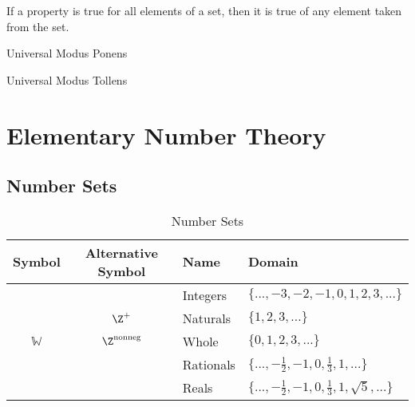 \documentclass[11pt]{article}
\newcommand\W{\ensuremath{\mathbb{W}}}
\begin{document}
\begin{definition}\label{def:universal-instantiation}
    If a property is true for all elements of a set, then it is true of any element taken from the set.
\end{definition}

\begin{bbox}{\centering Universal Modus Ponens}
    \begin{center}
        \begin{argument}
    \end{argument}
    \end{center}
\end{bbox}

\begin{bbox}{\centering Universal Modus Tollens}
    \begin{center}
        \begin{argument}
    \end{argument}
    \end{center}
\end{bbox}

\section{Elementary Number Theory}

\subsection{Number Sets}

\begin{table}[!htbp]
    \centering
    \begin{tabular}{ c c l l }
        \toprule
        Symbol  & Alternative Symbol    & Name      & Domain \\
        \midrule
        \Z      &                       & Integers  & $\{ ..., -3,-2,-1,0,1,2,3, ... \}$ \\
        \N      & $\Z^+$                & Naturals  & $\{ 1,2,3, ... \}$ \\
        \W      & $\Z^{\text{nonneg}}$  & Whole     & $\{ 0,1,2,3, ... \}$ \\
        \Q      &                       & Rationals & $\{ ..., -\frac{1}{2}, -1, 0, \frac{1}{3}, 1, ... \}$ \\
        \R      &                       & Reals     & $\{ ..., -\frac{1}{2}, -1, 0, \frac{1}{3}, 1, \sqrt{5}, ... \}$ \\
        \bottomrule
    \end{tabular}
    \label{tab:tbl-number-sets}
    \caption{Number Sets}
\end{table}
\end{document}
